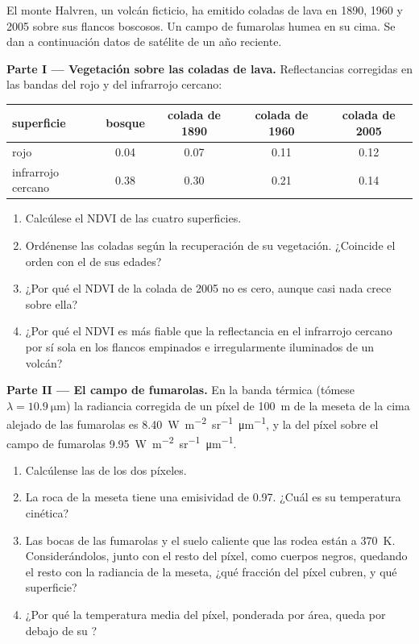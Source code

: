 \begin{problem}
\label{pb:b3:remote-sensing-gis:1}
El monte Halvren, un volcán ficticio, ha emitido coladas de lava en 1890, 1960
y 2005 sobre sus flancos boscosos. Un campo de fumarolas humea en su cima.
Se dan a continuación datos de satélite de un año reciente.

\medskip\noindent\textbf{Parte I --- Vegetación sobre las coladas de lava.} Reflectancias corregidas
en las bandas del rojo y del infrarrojo cercano:
\begin{center}
\small
\begin{tabular}{lcccc}
\hline
superficie & bosque & colada de 1890 & colada de 1960 & colada de 2005 \\
\hline
rojo & 0.04 & 0.07 & 0.11 & 0.12 \\
infrarrojo cercano & 0.38 & 0.30 & 0.21 & 0.14 \\
\hline
\end{tabular}
\end{center}
\begin{enumerate}
\item Calcúlese el NDVI de las cuatro superficies.
\item Ordénense las coladas según la recuperación de su vegetación. ¿Coincide el orden
  con el de sus edades?
\item ¿Por qué el NDVI de la colada de 2005 no es cero, aunque casi
  nada crece sobre ella?
\item ¿Por qué el NDVI es más fiable que la reflectancia en el infrarrojo cercano
  por sí sola en los flancos empinados e irregularmente iluminados de un volcán?
\end{enumerate}

\medskip\noindent\textbf{Parte II --- El campo de fumarolas.} En la banda térmica
(tómese $\lambda = \qty{10.9}{\micro\metre}$) la radiancia corregida de
un píxel de \qty{100}{m} de la meseta de la cima alejado de las fumarolas es
\qty{8.40}{W.m^{-2}.sr^{-1}.\micro\metre^{-1}}, y la del píxel sobre
el campo de fumarolas \qty{9.95}{W.m^{-2}.sr^{-1}.\micro\metre^{-1}}.
\begin{enumerate}[resume]
\item Calcúlense las  de los dos píxeles.
\item La roca de la meseta tiene una emisividad de 0.97. ¿Cuál es su temperatura
  cinética?
\item Las bocas de las fumarolas y el suelo caliente que las rodea están a
  \qty{370}{K}. Considerándolos, junto con el resto del píxel, como cuerpos negros,
  quedando el resto con la radiancia de la meseta, ¿qué fracción del píxel
  cubren, y qué superficie?
\item ¿Por qué la temperatura media del píxel, ponderada por área, queda por debajo
  de su ?
\end{enumerate}


\end{problem}
